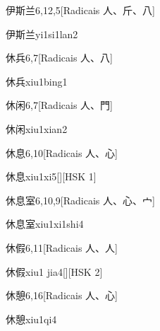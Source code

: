 \begin{entry}{伊斯兰}{6,12,5}[Radicais ⼈、⽄、⼋]
  \begin{phonetics}{伊斯兰}{yi1si1lan2}
  \end{phonetics}
\end{entry}

\begin{entry}{休兵}{6,7}[Radicais ⼈、⼋]
  \begin{phonetics}{休兵}{xiu1bing1}
  \end{phonetics}
\end{entry}

\begin{entry}{休闲}{6,7}[Radicais ⼈、⾨]
  \begin{phonetics}{休闲}{xiu1xian2}
  \end{phonetics}
\end{entry}

\begin{entry}{休息}{6,10}[Radicais ⼈、⼼]
  \begin{phonetics}{休息}{xiu1xi5}[][HSK 1]
  \end{phonetics}
\end{entry}

\begin{entry}{休息室}{6,10,9}[Radicais ⼈、⼼、⼧]
  \begin{phonetics}{休息室}{xiu1xi1shi4}
  \end{phonetics}
\end{entry}

\begin{entry}{休假}{6,11}[Radicais ⼈、⼈]
  \begin{phonetics}{休假}{xiu1 jia4}[][HSK 2]
  \end{phonetics}
\end{entry}

\begin{entry}{休憩}{6,16}[Radicais ⼈、⼼]
  \begin{phonetics}{休憩}{xiu1qi4}
  \end{phonetics}
\end{entry}

